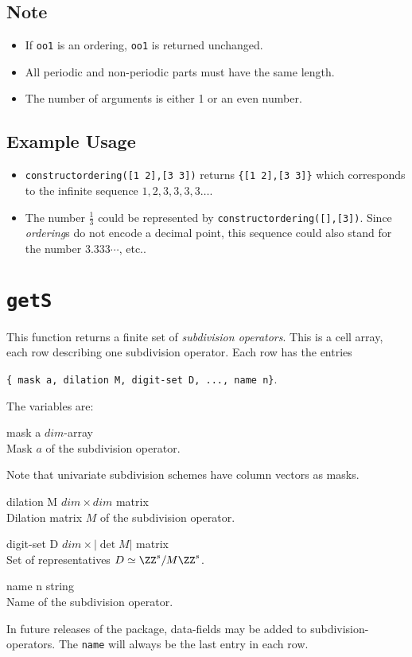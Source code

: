 \subsection*{Note}
\begin{itemize}
    \item If \texttt{oo1} is an ordering, \texttt{oo1} is returned unchanged.
    \item All periodic and non-periodic parts must have the same length.
    \item The number of arguments is either 1 or an even number.
\end{itemize}

\subsection*{Example Usage}
\begin{itemize}
    \item \texttt{constructordering([1 2],[3 3])} returns \texttt{\{[1 2],[3 3]\}} which corresponds to the infinite sequence
    $1,2,3,3,3,3\ldots$.
    \item The number $\frac{1}{3}$ could be represented by \texttt{constructordering([],[3])}. Since \emph{ordering}s do not encode a decimal point, this sequence could also stand for the number $3.333\cdots$, etc..
\end{itemize}

\section{\texttt{getS}}
This function returns a finite set of \emph{subdivision operators}. This is a cell array, each row describing one subdivision operator. Each row has the entries
\begin{center}
    \texttt{\{ mask a, dilation M, digit-set D, ..., name n\}}.
\end{center}
The variables are: 
\begin{param}
    \item[mask a] $dim$-array\\Mask $a$ of the subdivision operator. 
    
    Note that univariate subdivision schemes have column vectors as masks.
    
    \item[dilation M] $dim\times dim$ matrix\\Dilation matrix $M$ of the subdivision operator.
    \item[digit-set D] $dim\times |\det M|$ matrix\\Set of representatives $D\simeq \ZZ^s/M\ZZ^s$.
    \item[name n] string\\Name of the subdivision operator.
\end{param} 
In future releases of the package, data-fields may be added to subdivision-operators. The \texttt{name} will always be the last entry in each row.

